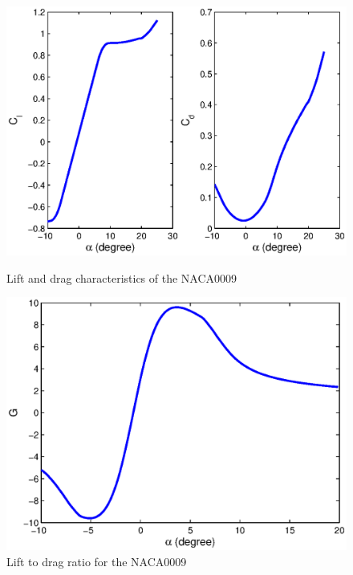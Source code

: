 \begin{figure}[ht]
\begin{center}
  \scalebox{1.0}
  {\includegraphics{./Figures/NACA0009_steady_map_Cl_Cd.eps}} 
\end{center}
\caption{Lift and drag characteristics of the NACA0009}
\end{figure}


\begin{figure}[ht]
\begin{center}
   \includegraphics{./Figures/NACA0009_steady_map_G.eps}
\end{center}
\caption{Lift to drag ratio for the NACA0009}
\label{fig:G_vs_alpha_qs}
\end{figure}

